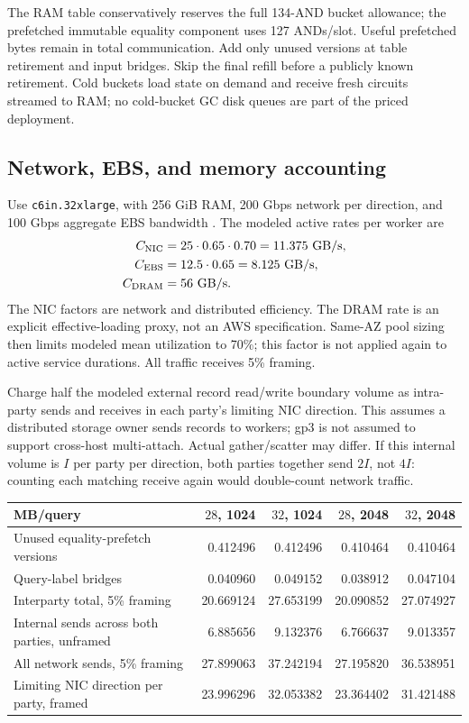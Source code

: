 \documentclass[11pt]{article}
\begin{document}
The RAM table conservatively reserves the full 134-AND bucket allowance;
the prefetched immutable equality component uses 127 ANDs/slot. Useful
prefetched bytes remain in total communication. Add only unused versions
at table retirement and input bridges. Skip the final refill before a
publicly known retirement. Cold buckets load state on demand and receive
fresh circuits streamed to RAM; no cold-bucket GC disk queues are part of
the priced deployment.

\subsection{Network, EBS, and memory accounting}
Use \texttt{c6in.32xlarge}, with 256 GiB RAM, 200 Gbps network per direction,
and 100 Gbps aggregate EBS bandwidth \cite{aws-compute,aws-network}. The
modeled active rates per worker are
\begin{align*}
 C_{\rm NIC}&=25\cdot0.65\cdot0.70=11.375\ {\rm GB/s},\\
 C_{\rm EBS}&=12.5\cdot0.65=8.125\ {\rm GB/s},\\
 C_{\rm DRAM}&=56\ {\rm GB/s}.
\end{align*}
The NIC factors are network and distributed efficiency. The DRAM rate is
an explicit effective-loading proxy, not an AWS specification. Same-AZ pool sizing
then limits modeled mean utilization to 70\%; this factor is not applied
again to active service durations. All traffic receives 5\% framing.

Charge half the modeled external record read/write boundary volume as
intra-party sends and receives in each party's limiting NIC direction.
This assumes a distributed storage owner sends records to workers; gp3
is not assumed to support cross-host multi-attach. Actual gather/scatter
may differ. If this internal volume is $I$ per party per direction, both
parties together send $2I$, not $4I$: counting each matching receive again
would double-count network traffic.

\begin{center}\footnotesize
\begin{tabular}{lrrrr}\toprule
MB/query & $28$, 1024 & $32$, 1024 & $28$, 2048 & $32$, 2048\\\midrule
Unused equality-prefetch versions & 0.412496 & 0.412496 & 0.410464 & 0.410464\\
Query-label bridges & 0.040960 & 0.049152 & 0.038912 & 0.047104\\
Interparty total, 5\% framing & 20.669124 & 27.653199 & 20.090852 & 27.074927\\
Internal sends across both parties, unframed & 6.885656 & 9.132376 & 6.766637 & 9.013357\\
All network sends, 5\% framing & 27.899063 & 37.242194 & 27.195820 & 36.538951\\
Limiting NIC direction per party, framed & 23.996296 & 32.053382 & 23.364402 & 31.421488\\
\bottomrule\end{tabular}\end{center}
\end{document}
